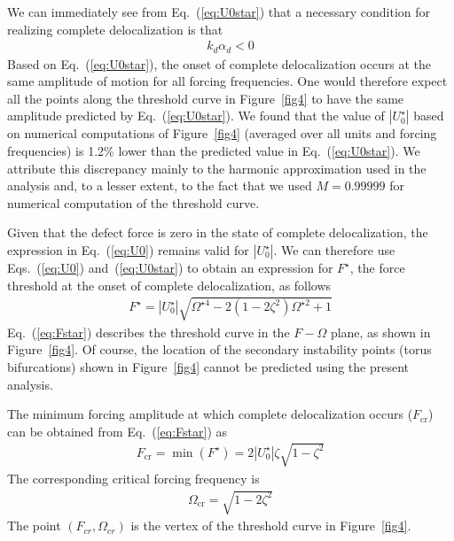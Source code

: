 \documentclass[aps,pre,twocolumn,groupedaddress]{revtex4-1}
\begin{document}
We can immediately see from Eq.~(\ref{eq:U0star}) that a necessary condition for realizing complete delocalization is that %
\begin{eqnarray}
	\label{eq:condition}
	k_d \alpha_d<0
\end{eqnarray}
Based on Eq.~(\ref{eq:U0star}), the onset of complete delocalization occurs at the same amplitude of motion for all forcing frequencies. One would therefore expect all the points along the threshold curve in Figure~\ref{fig4} to have the same amplitude predicted by Eq.~(\ref{eq:U0star}). We found that the value of $|U_0^\star|$ based on numerical computations of Figure~\ref{fig4} (averaged over all units and forcing frequencies) is 1.2\% lower than the predicted value in Eq.~(\ref{eq:U0star}). We attribute this discrepancy mainly to the harmonic approximation used in the analysis and, to a lesser extent, to the fact that we used $M=0.99999$ for numerical computation of the threshold curve. 

Given that the defect force is zero in the state of complete delocalization, the expression in Eq.~(\ref{eq:U0}) remains valid for $|U_0^\star|$. We can therefore use Eqs.~(\ref{eq:U0}) and~(\ref{eq:U0star}) to obtain an expression for $F^\star$, the force threshold at the onset of complete delocalization, as follows
\begin{eqnarray}
	\label{eq:Fstar}
	F^{\star} = |U_0^\star| 
		\sqrt{ \Omega^{\star 4} -2 (1-2\zeta^2) \Omega^{\star 2}+1 }
\end{eqnarray}
Eq.~(\ref{eq:Fstar}) describes the threshold curve in the $F-\Omega$ plane, as shown in Figure~\ref{fig4}. Of course, the location of the secondary instability points (torus bifurcations) shown in Figure~\ref{fig4} cannot be predicted using the present analysis. 

The minimum forcing amplitude at which complete delocalization occurs ($F_{\text{cr}}$) can be obtained from Eq.~(\ref{eq:Fstar}) as 
\begin{eqnarray}
	\label{eq:Fcr}
	F_{\text{cr}} = \min\left( F^{\star} \right) = 2 |U_0^\star| \zeta \sqrt{1-\zeta^2 }
\end{eqnarray}
The corresponding critical forcing frequency is 
\begin{eqnarray}
	\label{eq:Fcr}
	\Omega_{\text{cr}} = \sqrt{1-2\zeta^2 }
\end{eqnarray}
The point $(F_{cr},\Omega_{cr})$ is the vertex of the threshold curve in Figure~\ref{fig4}. 
\end{document}
